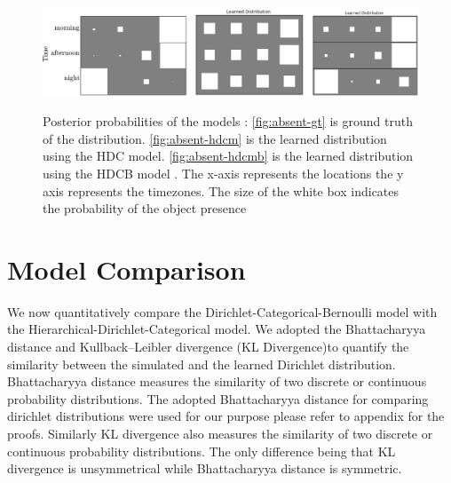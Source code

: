 \begin{figure}
    \centering
    \includegraphics[width=\textwidth]{images/absent_learned.png}
       
    \begin{minipage}[t]{.35\textwidth}
    \label{fig:absent-gt}
    \end{minipage}%
    \begin{minipage}[t]{.3\textwidth}
    \label{fig:absent-hdcm}
    \end{minipage}
    \begin{minipage}[t]{.25\textwidth}
    \label{fig:absent-hdcmb}
    \end{minipage}

\caption[Posterior probabilities of HDC and HDCB ]{Posterior probabilities of the models : \ref{fig:absent-gt} is ground truth of the distribution. \ref{fig:absent-hdcm} is the learned distribution using the HDC model. \ref{fig:absent-hdcmb} is the learned distribution using the HDCB  model . The x-axis represents the locations the y axis represents the timezones. The size of the white box indicates the probability of the object presence }\label{fig:absent-eval}
    
\end{figure}


\section{Model Comparison}

We now quantitatively compare the Dirichlet-Categorical-Bernoulli model with the Hierarchical-Dirichlet-Categorical model. We adopted  the Bhattacharyya distance \cite{bhattacharyya1946measure} and Kullback–Leibler divergence \cite{kullback1951information} (KL Divergence)to quantify the similarity between the simulated and the learned Dirichlet  distribution.   Bhattacharyya distance measures the similarity of two discrete or continuous probability distributions. The  adopted Bhattacharyya distance \cite{rauber2008bhattacharyya} for comparing dirichlet distributions were used for our purpose please refer to appendix for the proofs. Similarly KL divergence also measures the similarity of two discrete or continuous probability distributions. The only difference being that KL divergence is unsymmetrical while Bhattacharyya distance is symmetric.

